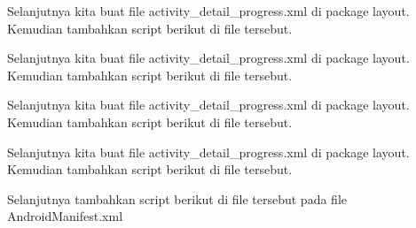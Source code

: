 Selanjutnya kita buat file activity\_detail\_progress.xml di package layout. Kemudian tambahkan script berikut di file tersebut.





Selanjutnya kita buat file activity\_detail\_progress.xml di package layout. Kemudian tambahkan script berikut di file tersebut.





Selanjutnya kita buat file activity\_detail\_progress.xml di package layout. Kemudian tambahkan script berikut di file tersebut.





Selanjutnya kita buat file activity\_detail\_progress.xml di package layout. Kemudian tambahkan script berikut di file tersebut.





Selanjutnya tambahkan script berikut di file tersebut pada file AndroidManifest.xml
